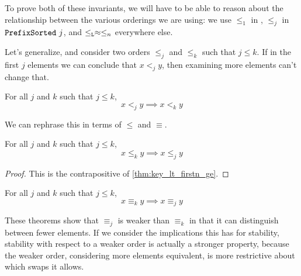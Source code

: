 \documentclass[sigplan,10pt,anonymous,review]{thesis}
\begin{document}
To prove both of these invariants, we will have to be able to reason
about the relationship between the various orderings we are using: we
use $\le_1$ in , $\le_j$ in $\texttt{\textup{PrefixSorted}}~j$, and
$\le_{\texttt{\textup{L}}} \approx \le_n$ everywhere else.

Let's generalize, and consider two orders $\le_j$ and $\le_k$ such that $j
\le k$. If in the first $j$ elements we can conclude that $x <_j y$,
then examining more elements can't change that.

\begin{theorem}
  \label{thm:key_lt_firstn_ge}
  For all $j$ and $k$ such that $j \le k$,
  \begin{equation*}
    x <_j y \implies x <_k y
  \end{equation*}
\end{theorem}

We can rephrase this in terms of $\le$ and $\equiv$.

\begin{corollary}
  For all $j$ and $k$ such that $j \le k$,
  \begin{equation*}
    x \le_k y \implies x \le_j y
  \end{equation*}
\end{corollary}
\begin{proof}
  This is the contrapositive of \cref{thm:key_lt_firstn_ge}.
\end{proof}

\begin{corollary}
  For all $j$ and $k$ such that $j \le k$,
  \begin{equation*}
    x \equiv_k y \implies x \equiv_j y
  \end{equation*}
\end{corollary}

These theorems show that $\equiv_j$ is weaker than $\equiv_k$ in that it can
distinguish between fewer elements. If we consider the implications
this has for stability, stability with respect to a weaker order is
actually a stronger property, because the weaker order, considering
more elements equivalent, is more restrictive about which swaps it
allows.
\end{document}
